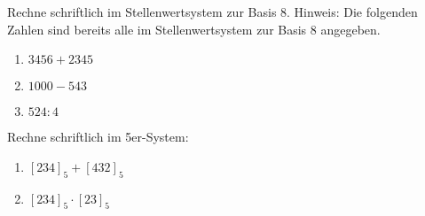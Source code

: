 \documentclass{cssheet}
\begin{document}
\begin{aufgabe}[SoSe 24]
	Rechne schriftlich im Stellenwertsystem zur Basis 8. Hinweis: Die folgenden Zahlen sind bereits alle im Stellenwertsystem zur Basis 8 angegeben.
	\begin{enumerate}
		\item $3456+2345$
		\item $1000-543$
		\item $524: 4$
	\end{enumerate}
\end{aufgabe}

\begin{aufgabe}[WiSe 24/25]
	Rechne schriftlich im 5er-System:
	\begin{enumerate}
		\item $[234]_5+[432]_5$
		\item $[234]_5 \cdot[23]_5$
	\end{enumerate}
\end{aufgabe}


\vspace*{10mm}
\printlicense

\printsocials
\end{document}
